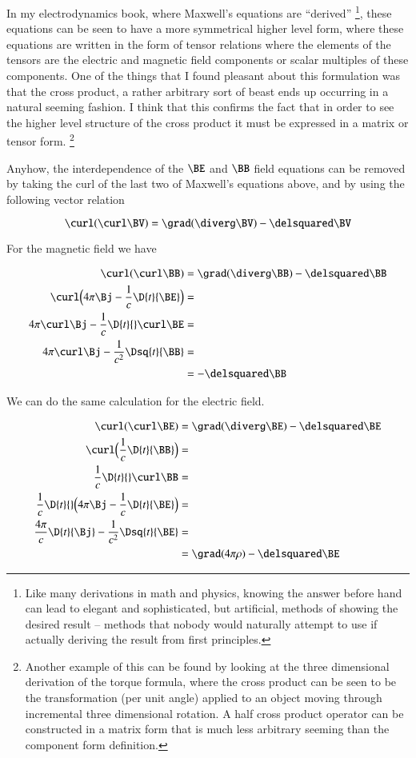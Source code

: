 \documentclass{article}      %
\begin{document}
In my electrodynamics book, where Maxwell's equations are ``derived''
\footnote
{
Like many derivations in math and physics, knowing the answer before hand
can lead to elegant and sophisticated, but artificial, methods of showing the desired result --
methods that
nobody would naturally attempt to use if actually deriving the result from first principles.
},
these equations can be seen to have a more symmetrical higher level form, where
these equations are written in the form of tensor relations where
the elements of the tensors are the electric and magnetic field components 
or scalar multiples of these components.  One of the things that I found 
pleasant about this formulation was that the cross product, a rather 
arbitrary sort of beast ends up occurring in a natural seeming fashion.  I 
think that this confirms the fact that in order to see the higher level 
structure of the cross product it must be expressed in a matrix or tensor form.
\footnote{
Another example of this can be found by looking at the three dimensional 
derivation of the torque formula, where the 
cross product can be seen to be the transformation (per unit angle)
applied to an object moving through incremental three dimensional 
rotation.  A half cross product operator can be constructed in a matrix form 
that is much less arbitrary seeming than the component form definition.
}

Anyhow, 
the interdependence of the $\BE$ and $\BB$ field equations can be removed by taking the
curl of the last two of Maxwell's equations above, and by using the following
vector relation

\begin{equation*}
\curl (\curl \BV) = \grad (\diverg \BV) - \delsquared \BV
\end{equation*}

For the magnetic field we have

\begin{align*}
\curl (\curl \BB) 			&= \grad (\diverg \BB) - \delsquared \BB \\
\curl \Bigl(4\pi\Bj - \frac{1}{c} \D{t}{\BE} \Bigr) 	&= \\
4\pi\curl \Bj - \frac{1}{c} \D{t}{} \curl \BE 	&= \\
4\pi\curl \Bj - \frac{1}{c^2} \Dsq{t}{\BB} &= \\
      	     				&= - \delsquared \BB
\end{align*}

We can do the same calculation for the electric field.

\begin{align*}
\curl (\curl \BE) &= \grad (\diverg \BE) - \delsquared \BE \\
\curl \Bigl(\frac{1}{c} \D{t}{\BB}\Bigr) &= \\
\frac{1}{c} \D{t}{} \curl \BB &= \\
\frac{1}{c} \D{t}{} \Bigl(4\pi \Bj - \frac{1}{c} \D{t}{\BE} \Bigr) &= \\
\frac{4\pi}{c} \D{t}{\Bj} - \frac{1}{c^2} \Dsq{t}{\BE} &= \\
             &= \grad (4\pi\rho) - \delsquared \BE \\
\end{align*}
\end{document}
